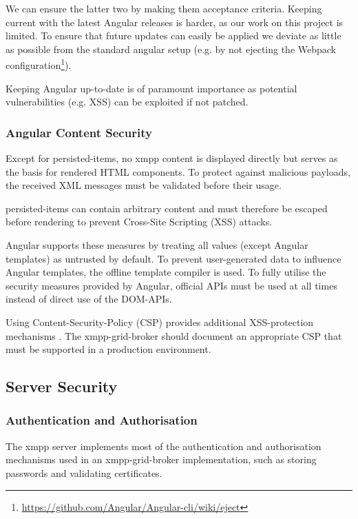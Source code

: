 We can ensure the latter two by making them acceptance criteria.
Keeping current with the latest Angular releases is harder, as our work on this project is limited.
To ensure that future updates can easily be applied we deviate as little as possible from the standard angular setup (e.g. by not ejecting the Webpack configuration\footnote{\url{https://github.com/Angular/Angular-cli/wiki/eject}}).

Keeping Angular up-to-date is of paramount importance as potential vulnerabilities (e.g. XSS) can be exploited if not patched.

\subsubsection{Angular Content Security}

Except for \glspl{persisted-item}, no \gls{xmpp} content is displayed directly but serves as the basis for rendered HTML components.
To protect against malicious payloads, the received XML messages must be validated before their usage.

\Glspl{persisted-item} can contain arbitrary content and must therefore be escaped before rendering to prevent Cross-Site Scripting (XSS) attacks.

Angular supports these measures by treating all values (except Angular templates) as untrusted by default.
To prevent user-generated data to influence Angular templates, the offline template compiler is used. To fully utilise the security measures provided by Angular, official APIs must be used at all times instead of direct use of the DOM-APIs.~\cite{angular-security}

Using Content-Security-Policy (CSP) provides additional XSS-protection mechanisms \cite{w3c-csp}.
The \gls{xmpp-grid-broker} should document an appropriate CSP that must be supported in a production environment.

\subsection{Server Security}

\subsubsection{Authentication and Authorisation}

The \gls{xmpp} server implements most of the authentication and authorisation mechanisms used in an \gls{xmpp-grid-broker} implementation, such as storing passwords and validating certificates.

